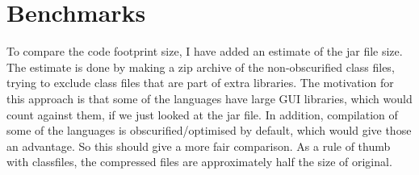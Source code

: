 \chapter{Benchmarks}



To compare the code footprint size, I have added an estimate of the jar file size. 
The estimate is done by making a zip archive of the non-obscurified class files,
trying to exclude class files that are part of extra libraries.
The motivation for this approach is that some of the languages have large GUI libraries,
which would count against them, if we just looked at the jar file. 
In addition, compilation of some of the languages is obscurified/optimised by default,
which would give those an advantage. So this should give a more fair comparison.
As a rule of thumb with classfiles, the compressed files are approximately half the size of original.
